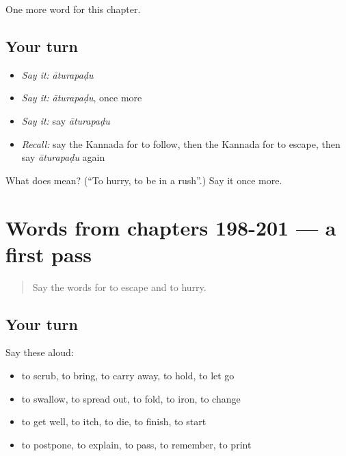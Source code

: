 \begin{grammarlens}[title={What you've built}]
One more word for this chapter.
\end{grammarlens}

\subsection*{Your turn}
\begin{itemize}
\raggedright
  \item \emph{Say it:} \emph{āturapaḍu}
  \item \emph{Say it:} \emph{āturapaḍu}, once more
  \item \emph{Say it:} say \emph{āturapaḍu}
  \item \emph{Recall:} say the Kannada for to follow, then the Kannada for to escape, then say \emph{āturapaḍu} again
\end{itemize}

\begin{tcolorbox}[breakable,colback=teal!4,colframe=teal!35!black,title={Before you move on}]
What does  mean? (\textquotedblleft{}To hurry, to be in a rush\textquotedblright{}.) Say it once more.
\end{tcolorbox}
\section[(dialogue)]{Words from chapters 198-201 — a first pass}

\label{lesson:KA-R206-first-pass-words-from-chapters-198-201}



\begin{quote}
Say the words for to escape and to hurry.
\end{quote}

\subsection*{Your turn}
Say these aloud:

\begin{itemize}
\raggedright
  \item to scrub, to bring, to carry away, to hold, to let go
  \item to swallow, to spread out, to fold, to iron, to change
  \item to get well, to itch, to die, to finish, to start
  \item to postpone, to explain, to pass, to remember, to print
\end{itemize}

